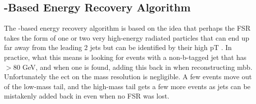 \subsection{\pt-Based Energy Recovery Algorithm}
The \pt-based energy recovery algorithm is based on the idea that perhaps the FSR takes the form of one
 or two very high-energy radiated particles that can end up far away from the leading 2 jets but can be
 identified by their high pT . In practice, what this means is looking for events with a non-b-tagged jet that
 has \pt$>$80 GeV, and when one is found, adding this back in when reconstructing mbb.
 Unfortunately the ect on the mass resolution is negligible. A few events move out of the low-mass
 tail, and the high-mass tail gets a few more events as jets can be mistakenly added back in even when no
 FSR was lost.

